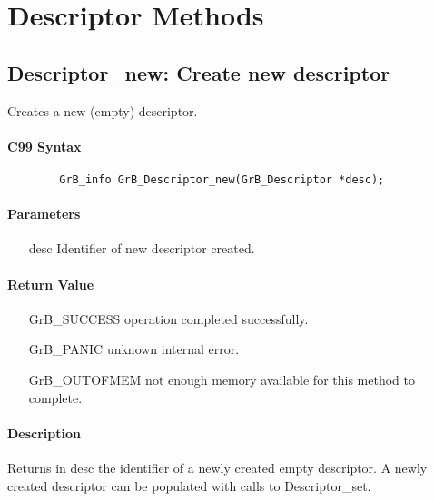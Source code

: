\section{Descriptor Methods}

\subsection{{\sf Descriptor\_new}: Create new descriptor}

Creates a new (empty) descriptor.

\paragraph{C99 Syntax}

\begin{verbatim}
        GrB_info GrB_Descriptor_new(GrB_Descriptor *desc);
\end{verbatim}

\paragraph{Parameters}

\begin{itemize}[leftmargin=1.1in]
    \item[{\sf desc}] Identifier of new descriptor created.
\end{itemize}

\paragraph{Return Value}

\begin{itemize}[leftmargin=2.1in]
\item[{\sf GrB\_SUCCESS}]           operation completed successfully.
\item[{\sf GrB\_PANIC}]             unknown internal error.
\item[{\sf GrB\_OUTOFMEM}]          not enough memory available for this method to complete.
\end{itemize}

\paragraph{Description}

Returns in {\sf desc} the identifier of a newly created empty descriptor.
A newly created descriptor can be populated with calls to {\sf Descriptor\_set}.


